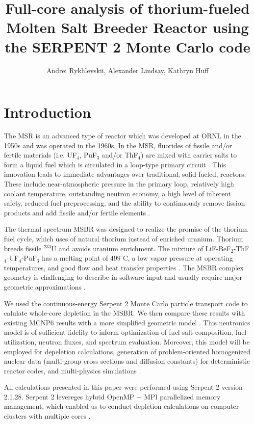 \documentclass{anstrans}
\title{Full-core analysis of thorium-fueled Molten Salt Breeder Reactor using 
the SERPENT 2 Monte Carlo code}
\author{Andrei Rykhlevskii, Alexander Lindsay, Kathryn Huff}
\institute{
Department of Nuclear, Plasma, and Radiological Engineering, University of 
Illinois at Urbana-Champaign \break
Urbana, IL
}
\begin{document}
\section{Introduction}
The \gls{MSR} is an advanced type of reactor which was developed at \gls{ORNL} 
in the 1950s and was operated in the 1960s. In the MSR, fluorides of fissile 
and/or fertile materials (i.e. UF$_4$, PuF$_3$ and/or ThF$_4$) are mixed with 
carrier salts to form a liquid fuel which is circulated in a loop-type primary 
circuit \cite{haubenreich_experience_1970}. This innovation leads to immediate 
advantages over traditional, solid-fueled, reactors. These include 
near-atmospheric pressure in the primary loop, relatively high coolant 
temperature, outstanding neutron economy, a high level of inherent safety, 
reduced fuel preprocessing, and the ability to continuously remove fission 
products and add fissile and/or fertile elements \cite{leblanc_molten_2010}. 

The thermal spectrum \gls{MSBR} was designed to realize the promise of the 
thorium fuel cycle, which uses of natural thorium instead of enriched uranium.  
Thorium breeds fissile $^{233}$U and avoids uranium enrichment. The mixture of 
LiF-BeF$_2$-ThF$_4$-UF$_4$-PuF$_3$ has a melting point of $499^\circ$C, a low 
vapor pressure at operating temperatures, and good flow and heat transfer 
properties \cite{robertson_conceptual_1971}. The \gls{MSBR} complex geometry is 
challenging to describe in software input and usually require major geometric 
approximations \cite{park_whole_2015}. 

We used the continuous-energy Serpent 2 Monte Carlo particle transport code to 
calulate whole-core depletion in the \gls{MSBR}. We then compare these results 
with existing MCNP6 results with a more simplified geometric model 
\cite{park_whole_2015,leppanen_serpent_2012}. This neutronics model is of 
sufficient fidelity to inform optimization of fuel salt composition, fuel 
utilization, neutron fluxes, and spectrum evaluation. Moreover, this model  
will be employed for depeletion calculations, generation of problem-oriented 
homogenized nuclear data (multi-group cross sections and diffusion constants) 
for deterministic reactor codes, and multi-physics simulations 
\cite{fridman_use_2011,valtavirta_coupled_2017}.

All calculations presented in this paper were performed using Serpent 2 version 
2.1.28. Serpent 2 levereges hybrid OpenMP + MPI parallelized memory management, 
which enabled us to conduct depletion calculations on computer clusters with 
multiple cores \cite{leppanen_serpent_2015}. 
\end{document}
